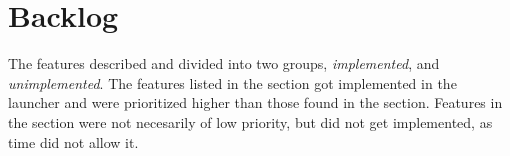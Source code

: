 \chapter{Backlog}
\label{chap:backlog}

The features described and divided into two groups, \emph{implemented}, and \emph{unimplemented}.
The features listed in the  section got implemented in the launcher and were prioritized higher than those found in the  section. Features in the  section were not necesarily of low priority, but did not get implemented, as time did not allow it. 




